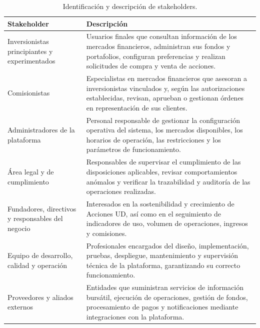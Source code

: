 \documentclass[11pt,a4paper,oneside]{article}
\begin{document}
\begin{table}[H]
\caption{Identificación y descripción de stakeholders.}
\begin{tabularx}{\textwidth}{|
>{\RaggedRight\arraybackslash}X|
>{\RaggedRight\arraybackslash}X|}\hline

\rowcolor{negroTabla}
\centering\color{white}\bfseries Stakeholder &
\centering\arraybackslash\color{white}\bfseries Descripción
\\\hline

Inversionistas principiantes y experimentados &
Usuarios finales que consultan información de los mercados
financieros, administran sus fondos y portafolios, configuran
preferencias y realizan solicitudes de compra y venta de acciones.
\\\hline

Comisionistas &
Especialistas en mercados financieros que asesoran a inversionistas
vinculados y, según las autorizaciones establecidas, revisan,
aprueban o gestionan órdenes en representación de sus clientes.
\\\hline

Administradores de la plataforma &
Personal responsable de gestionar la configuración operativa
del sistema, los mercados disponibles, los horarios de operación,
las restricciones y los parámetros de funcionamiento.
\\\hline

Área legal y de cumplimiento &
Responsables de supervisar el cumplimiento de las disposiciones
aplicables, revisar comportamientos anómalos y verificar la
trazabilidad y auditoría de las operaciones realizadas.
\\\hline

Fundadores, directivos y responsables del negocio &
Interesados en la sostenibilidad y crecimiento de Acciones UD,
así como en el seguimiento de indicadores de uso, volumen de
operaciones, ingresos y comisiones.
\\\hline

Equipo de desarrollo, calidad y operación &
Profesionales encargados del diseño, implementación, pruebas,
despliegue, mantenimiento y supervisión técnica de la plataforma,
garantizando su correcto funcionamiento.
\\\hline

Proveedores y aliados externos &
Entidades que suministran servicios de información bursátil,
ejecución de operaciones, gestión de fondos, procesamiento
de pagos y notificaciones mediante integraciones con
la plataforma.
\\\hline

\end{tabularx}
\end{table}
\end{document}
